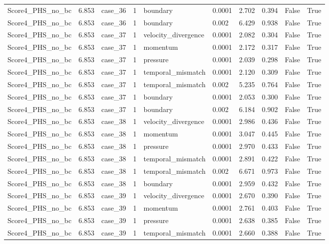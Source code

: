 \begin{longtable}{llllllllll}
Score4\_PHS\_no\_bc & 6.853 & case\_36 & 1 & boundary & 0.0001 & 2.702 & 0.394 & False & True \\
Score4\_PHS\_no\_bc & 6.853 & case\_36 & 1 & boundary & 0.002 & 6.429 & 0.938 & False & True \\
Score4\_PHS\_no\_bc & 6.853 & case\_37 & 1 & velocity\_divergence & 0.0001 & 2.082 & 0.304 & False & True \\
Score4\_PHS\_no\_bc & 6.853 & case\_37 & 1 & momentum & 0.0001 & 2.172 & 0.317 & False & True \\
Score4\_PHS\_no\_bc & 6.853 & case\_37 & 1 & pressure & 0.0001 & 2.039 & 0.298 & False & True \\
Score4\_PHS\_no\_bc & 6.853 & case\_37 & 1 & temporal\_mismatch & 0.0001 & 2.120 & 0.309 & False & True \\
Score4\_PHS\_no\_bc & 6.853 & case\_37 & 1 & temporal\_mismatch & 0.002 & 5.235 & 0.764 & False & True \\
Score4\_PHS\_no\_bc & 6.853 & case\_37 & 1 & boundary & 0.0001 & 2.053 & 0.300 & False & True \\
Score4\_PHS\_no\_bc & 6.853 & case\_37 & 1 & boundary & 0.002 & 6.184 & 0.902 & False & True \\
Score4\_PHS\_no\_bc & 6.853 & case\_38 & 1 & velocity\_divergence & 0.0001 & 2.986 & 0.436 & False & True \\
Score4\_PHS\_no\_bc & 6.853 & case\_38 & 1 & momentum & 0.0001 & 3.047 & 0.445 & False & True \\
Score4\_PHS\_no\_bc & 6.853 & case\_38 & 1 & pressure & 0.0001 & 2.970 & 0.433 & False & True \\
Score4\_PHS\_no\_bc & 6.853 & case\_38 & 1 & temporal\_mismatch & 0.0001 & 2.891 & 0.422 & False & True \\
Score4\_PHS\_no\_bc & 6.853 & case\_38 & 1 & temporal\_mismatch & 0.002 & 6.671 & 0.973 & False & True \\
Score4\_PHS\_no\_bc & 6.853 & case\_38 & 1 & boundary & 0.0001 & 2.959 & 0.432 & False & True \\
Score4\_PHS\_no\_bc & 6.853 & case\_39 & 1 & velocity\_divergence & 0.0001 & 2.670 & 0.390 & False & True \\
Score4\_PHS\_no\_bc & 6.853 & case\_39 & 1 & momentum & 0.0001 & 2.761 & 0.403 & False & True \\
Score4\_PHS\_no\_bc & 6.853 & case\_39 & 1 & pressure & 0.0001 & 2.638 & 0.385 & False & True \\
Score4\_PHS\_no\_bc & 6.853 & case\_39 & 1 & temporal\_mismatch & 0.0001 & 2.660 & 0.388 & False & True \\

\end{longtable}
